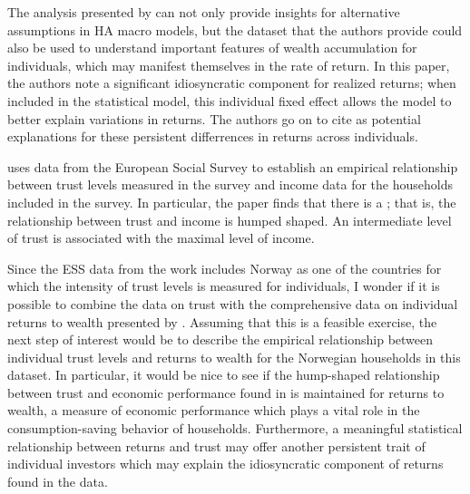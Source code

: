 \documentclass{scrartcl}
\begin{document}
The analysis presented by \cite{aflgdmlp20} can not only provide insights for alternative assumptions in HA macro models, but the dataset that the authors provide could also be used to understand important features of wealth accumulation for individuals, which may manifest themselves in the rate of return. In this paper, the authors note a significant idiosyncratic component for realized returns; when included in the statistical model, this individual fixed effect allows the model to better explain variations in returns. The authors go on to cite  as potential explanations for these persistent differrences in returns across individuals.

\cite{Butler2016} uses data from the European Social Survey to establish an empirical relationship between trust levels measured in the survey and income data for the households included in the survey. In particular, the paper finds that there is a ; that is, the relationship between trust and income is humped shaped. An intermediate level of trust is associated with the maximal level of income. 

Since the ESS data from the \cite{Butler2016} work includes Norway as one of the countries for which the intensity of trust levels is measured for individuals, I wonder if it is possible to combine the data on trust with the comprehensive data on individual returns to wealth presented by \cite{aflgdmlp20}. Assuming that this is a feasible exercise, the next step of interest would be to describe the empirical relationship between individual trust levels and returns to wealth for the Norwegian households in this dataset. In particular, it would be nice to see if the hump-shaped relationship between trust and economic performance found in \cite{Butler2016} is maintained for returns to wealth, a measure of economic performance which plays a vital role in the consumption-saving behavior of households. Furthermore, a meaningful statistical relationship between returns and trust may offer another persistent trait of individual investors which may explain the idiosyncratic component of returns found in the data. 
\end{document}
